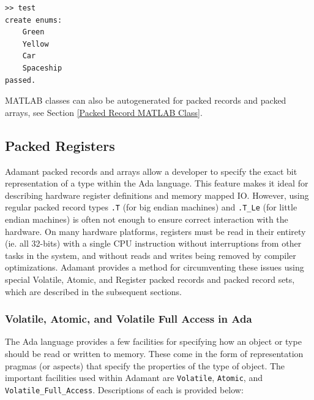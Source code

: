 \vspace{5mm} %
\begin{verbatim}
>> test
create enums:
    Green
    Yellow
    Car
    Spaceship
passed.
\end{verbatim}
\vspace{5mm} %

MATLAB classes can also be autogenerated for packed records and packed arrays, see Section \ref{Packed Record MATLAB Class}.

\subsection{Packed Registers}

Adamant packed records and arrays allow a developer to specify the exact bit representation of a type within the Ada language. This feature makes it ideal for describing hardware register definitions and memory mapped IO. However, using regular packed record types \texttt{.T} (for big endian machines) and \texttt{.T\_Le} (for little endian machines) is often not enough to ensure correct interaction with the hardware. On many hardware platforms, registers must be read in their entirety (ie. all 32-bits) with a single CPU instruction without interruptions from other tasks in the system, and without reads and writes being removed by compiler optimizations. Adamant provides a method for circumventing these issues using special Volatile, Atomic, and Register packed records and packed record sets, which are described in the subsequent sections.

\subsubsection{Volatile, Atomic, and Volatile Full Access in Ada}

The Ada language provides a few facilities for specifying how an object or type should be read or written to memory. These come in the form of representation pragmas (or aspects) that specify the properties of the type of object. The important facilities used within Adamant are \texttt{Volatile}, \texttt{Atomic}, and \texttt{Volatile\_Full\_Access}. Descriptions of each is provided below:

